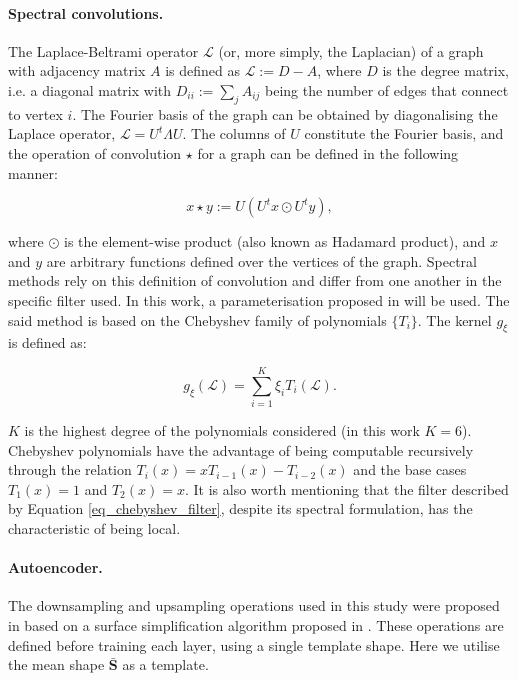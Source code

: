 \paragraph{Spectral convolutions.} The Laplace-Beltrami operator $\mathcal{L}$ (or, more simply, the Laplacian) of a graph with adjacency matrix $A$ is defined as $\mathcal{L}:=D-A$, where $D$ is the degree matrix, i.e. a diagonal matrix with $D_{ii}:=\sum_{j}A_{ij}$ being the number of edges that connect to vertex $i$. The Fourier basis of the graph can be obtained by diagonalising the Laplace operator, $\mathcal{L}=U^t\Lambda U$. The columns of $U$ constitute the Fourier basis, and the operation of convolution $\star$ for a graph can be defined in the following manner:

\begin{equation}
x\star y :=U(U^tx\odot U^ty),
\end{equation}{}

\noindent where $\odot$ is the element-wise product (also known as Hadamard product), and $x$ and $y$ are arbitrary functions defined over the vertices of the graph. Spectral methods rely on this definition of convolution and differ from one another in the specific filter used. In this work, a parameterisation proposed in \cite{ref_spectral_graph_conv} will be used. 
The said method is based on the Chebyshev family of polynomials $\{T_i\}$. The kernel $g_\xi$ is defined as:

\begin{equation}
g_{\xi}(\mathcal{L})=\sum_{i=1}^{K}\xi_i T_i(\mathcal{L}).
\label{eq_chebyshev_filter}
\end{equation}

\noindent $K$ is the highest degree of the polynomials considered (in this work $K=6$). Chebyshev polynomials have the advantage of being computable recursively through the relation $T_i(x)=xT_{i-1}(x)-T_{i-2}(x)$ and the base cases $T_1(x)=1$ and $T_2(x)=x$. It is also worth mentioning that the filter described by Equation \ref{eq_chebyshev_filter}, despite its spectral formulation, has the characteristic of being local.

\paragraph{Autoencoder.} The downsampling and upsampling operations used in this study were proposed in \cite{ref_coma} based on a surface simplification algorithm proposed in \cite{ref_quadric_error}. These operations are defined before training each layer, using a single template shape. Here we utilise the mean shape $\mathbf{\bar{S}}$ as a template.

